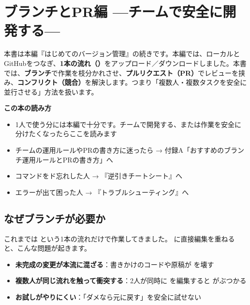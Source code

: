 \chapter{ブランチとPR編 —チームで安全に開発する—}

本書は本編『はじめてのバージョン管理』の続きです。本編では、ローカルとGitHubをつなぎ、\textbf{1本の流れ（）}をアップロード／ダウンロードしました。本書では、\textbf{ブランチ}で作業を枝分かれさせ、\textbf{プルリクエスト（PR）}でレビューを挟み、\textbf{コンフリクト（競合）}を解決します。つまり「複数人・複数タスクを安全に並行させる」方法を扱います。

\begin{hintbox}
\textbf{この本の読み方}
\begin{itemize}[leftmargin=1.4em, nosep]
  \item 1人で使う分には本編で十分です。チームで開発する、または作業を安全に分けたくなったらここを読みます
  \item チームの運用ルールやPRの書き方に迷ったら → 付録A「おすすめのブランチ運用ルールとPRの書き方」へ
  \item コマンドをド忘れした人 → 『逆引きチートシート』へ
  \item エラーが出て困った人 → 『トラブルシューティング』へ
\end{itemize}
\end{hintbox}

\section{なぜブランチが必要か}

これまでは  という1本の流れだけで作業してきました。 に直接編集を重ねると、こんな問題が起きます。

\begin{itemize}[leftmargin=1.4em]
  \item \textbf{未完成の変更が本流に混ざる}：書きかけのコードや原稿が  を壊す
  \item \textbf{複数人が同じ流れを触って衝突する}：2人が同時に  を編集すると  がぶつかる
  \item \textbf{お試しがやりにくい}：「ダメなら元に戻す」を安全に試せない
\end{itemize}

